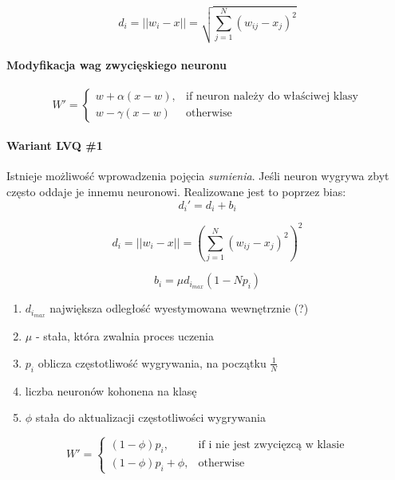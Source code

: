 \begin{equation}
 d_i = || w_i - x || = \sqrt{ \sum_{j=1}^N (w_{ij} - x_j)^2 }
\end{equation}

\paragraph{Modyfikacja wag zwycięskiego neuronu}

\begin{equation}
 W' = \begin{cases}
    w + \alpha (x-w),& \text{if neuron należy do właściwej klasy} \\
    w - \gamma (x-w) & \text{otherwise} 
\end{cases}
\end{equation}



\paragraph{Wariant LVQ \#1}

Istnieje możliwość wprowadzenia pojęcia \textit{sumienia}. Jeśli neuron wygrywa zbyt często oddaje
je innemu neuronowi. Realizowane jest to poprzez bias:
\begin{equation}
 d_i' = d_i + b_i
\end{equation}

\begin{equation}
 d_i = ||w_i - x|| = {\left(\sum_{j=1}^N (w_{ij} - x_j)^2 \right)}^2
\end{equation}

\begin{equation}
 b_i = \mu d_{i_{max}} (1 - N p_i)
\end{equation}

\begin{enumerate}
 \item $d_{i_{max}}$ największa odległość wyestymowana wewnętrznie (?)
 \item $\mu$ - stała, która zwalnia proces uczenia
 \item $p_i$ oblicza częstotliwość wygrywania, na początku $\frac{1}{N}$
 \item liczba neuronów kohonena na klasę
 \item $\phi$ stała do aktualizacji częstotliwości wygrywania
\end{enumerate}

\begin{equation}
 W' = \begin{cases}
    (1-\phi) p_i,& \text{if i nie jest zwycięzcą w klasie} \\
    (1 - \phi) p_i + \phi, & \text{otherwise}
\end{cases}
\end{equation}

